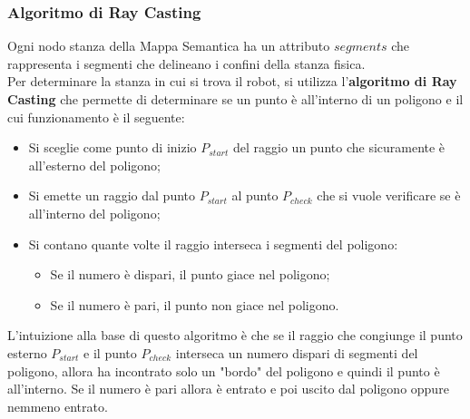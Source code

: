\subsubsection{Algoritmo di Ray Casting}
Ogni nodo stanza della Mappa Semantica ha un attributo $segments$ che rappresenta i segmenti che delineano i confini della stanza fisica. \\
Per determinare la stanza in cui si trova il robot, si utilizza l'\textbf{algoritmo di Ray Casting} \cite{haines_199424} che permette di determinare se un punto è all'interno di un poligono e il cui funzionamento è il seguente:
\begin{itemize}
  \item Si sceglie come punto di inizio $P_{start}$ del raggio un punto che sicuramente è all'esterno del poligono;
  \item Si emette un raggio dal punto $P_{start}$ al punto $P_{check}$ che si vuole verificare se è all'interno del poligono;
  \item Si contano quante volte il raggio interseca i segmenti del poligono:
        \begin{itemize}
          \item Se il numero è dispari, il punto giace nel poligono;
          \item Se il numero è pari, il punto non giace nel poligono.
        \end{itemize}
\end{itemize}
L'intuizione alla base di questo algoritmo è che se il raggio che congiunge il punto esterno $P_{start}$ e il punto $P_{check}$ interseca un numero dispari di segmenti del poligono, allora ha incontrato solo un "bordo" del poligono e quindi il punto è all'interno. Se il numero è pari allora è entrato e poi uscito dal poligono oppure nemmeno entrato.

